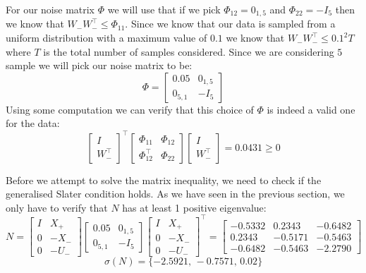 For our noise matrix $\Phi$ we will use that if we pick $\Phi_{12} = 0_{1,5}$ and $\Phi_{22} = -I_5$ then we know that $W_- W_-^\top \leq \Phi_{11}$. Since we know that our data is sampled from a uniform distribution with a maximum value of $0.1$ we know that $W_- W_-^\top \leq 0.1^2 T$ where $T$ is the total number of samples considered. Since we are considering $5$ sample we will pick our noise matrix to be:
\begin{equation*}
	\Phi = \begin{bmatrix} 0.05 & 0_{1,5} \\ 0_{5,1} & -I_5 \end{bmatrix}
\end{equation*}
Using some computation we can verify that this choice of $\Phi$ is indeed a valid one for the data:
\begin{equation}
\begin{bmatrix} I \\ W_-^\top \end{bmatrix} ^\top
\begin{bmatrix} \Phi_{11} & \Phi_{12} \\ \Phi_{12}^\top & \Phi_{22} \end{bmatrix}
\begin{bmatrix} I \\ W_-^\top \end{bmatrix} = 0.0431 \geq 0
\end{equation}

Before we attempt to solve the matrix inequality, we need to check if the generalised Slater condition holds. As we have seen in the previous section, we only have to verify that $N$ has at least 1 positive eigenvalue:
\begin{equation*}
 N = 
 \begin{bmatrix} I&X_+ \\ 0 & -X_- \\ 0&-U_- \end{bmatrix}
 \begin{bmatrix} 0.05 & 0_{1,5} \\ 0_{5,1} & -I_5 \end{bmatrix}
 \begin{bmatrix} I&X_+ \\ 0 & -X_- \\ 0&-U_- \end{bmatrix}^\top 
 =
 \begin{bmatrix} 
 -0.5332 &  0.2343 & -0.6482\\
  0.2343 & -0.5171 & -0.5463 \\
 -0.6482 & -0.5463 & -2.2790
 \end{bmatrix} 
\end{equation*}
\begin{equation*}
 \sigma(N) = \{ -2.5921 , \, -0.7571 , \, 0.02 \}
\end{equation*}

